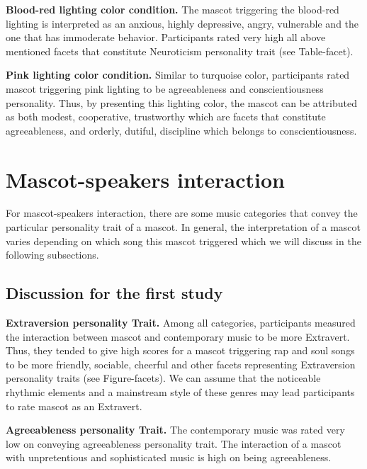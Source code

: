 \par\textbf{Blood-red lighting color condition.}
The mascot triggering the blood-red lighting is interpreted as an anxious,
highly depressive, angry, vulnerable and the one that has immoderate behavior.
Participants rated very high all above mentioned facets that constitute Neuroticism personality trait (see Table-facet).

\par\textbf{Pink lighting color condition.}
Similar to turquoise color, participants rated mascot triggering pink lighting to be
agreeableness and conscientiousness personality.
Thus, by presenting this lighting color, the mascot can be attributed as both modest, cooperative, trustworthy
which are facets that constitute agreeableness, and orderly, dutiful, discipline which belongs to conscientiousness.

\section{Mascot-speakers interaction}
\label{sec:mascot-speakers-interaction}
For mascot-speakers interaction, there are some music categories that convey the particular personality trait of a mascot.
In general, the interpretation of a mascot varies depending on which song this mascot triggered
which we will discuss in the following subsections.


\subsection{Discussion for the first study}
\label{subsec:discussion-for-the-first-study4}

\par\textbf{Extraversion personality Trait.}
Among all categories, participants measured the interaction between mascot and contemporary music
to be more Extravert.
Thus, they tended to give high scores for a mascot triggering rap and soul songs
to be more friendly, sociable, cheerful and other facets representing Extraversion personality traits (see Figure-facets).
We can assume that the noticeable rhythmic elements and a mainstream style of these genres
may lead participants to rate mascot as an Extravert.

\par\textbf{Agreeableness personality Trait.}
The contemporary music was rated very low on conveying agreeableness personality trait.
The interaction of a mascot with unpretentious and sophisticated music is high on being agreeableness.

